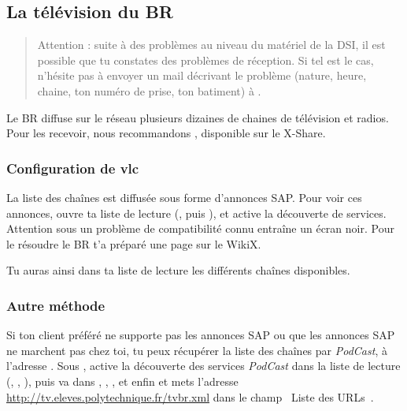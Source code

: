 
\subsection{La télévision du BR}
\label{TV}

   \begin{quote}
   Attention : suite à des problèmes au niveau du matériel de la DSI, il est possible que tu constates des problèmes de réception. Si tel est le cas, n'hésite pas à envoyer un mail décrivant le problème (nature, heure, chaine, ton numéro de prise, ton batiment) à .
   \end{quote}

Le BR diffuse sur le réseau plusieurs dizaines de chaines de télévision et radios. Pour les recevoir, nous recommandons , disponible sur le X-Share.

\subsubsection{Configuration de vlc}

La liste des cha\^ines est diffusée sous forme d'annonces SAP. Pour voir ces annonces, ouvre ta liste de lecture (, puis ), et active la découverte de services. Attention sous  un probl\`eme de compatibilité connu entra\^ine un écran noir. Pour le résoudre le BR t'a préparé une page sur le WikiX.


Tu auras ainsi dans ta liste de lecture les différents cha\^{i}nes disponibles.

\subsubsection{Autre méthode}

Si ton client préféré ne supporte pas les annonces SAP ou que les annonces SAP ne marchent pas chez toi, tu peux récupérer la liste des cha\^ines par
\emph{PodCast}, à l'adresse . Sous , active la découverte des services \emph{PodCast} dans la liste de
lecture (, , ), puis va dans , , ,  et enfin  et
mets l'adresse \url{http://tv.eleves.polytechnique.fr/tvbr.xml} dans le champ \guillemotleft~Liste des URLs~\guillemotright .

